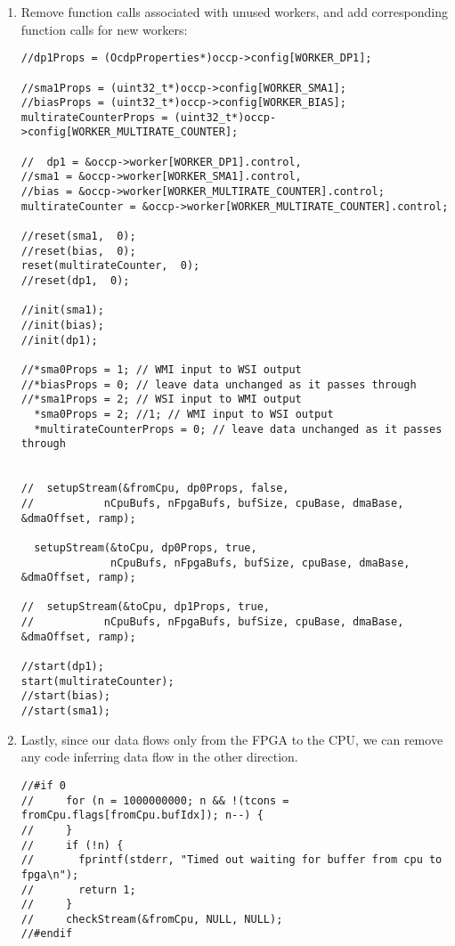 \begin{enumerate}
\begin{lstlisting}[language=customc]
\end{lstlisting}
\item Remove function calls associated with unused workers, and add corresponding function calls for new workers:

\begin{lstlisting}[language=customc]
//dp1Props = (OcdpProperties*)occp->config[WORKER_DP1];

//sma1Props = (uint32_t*)occp->config[WORKER_SMA1];
//biasProps = (uint32_t*)occp->config[WORKER_BIAS];
multirateCounterProps = (uint32_t*)occp->config[WORKER_MULTIRATE_COUNTER];

//  dp1 = &occp->worker[WORKER_DP1].control,
//sma1 = &occp->worker[WORKER_SMA1].control,
//bias = &occp->worker[WORKER_MULTIRATE_COUNTER].control;
multirateCounter = &occp->worker[WORKER_MULTIRATE_COUNTER].control;

//reset(sma1,  0);
//reset(bias,  0);
reset(multirateCounter,  0);
//reset(dp1,  0);

//init(sma1);
//init(bias);
//init(dp1);

//*sma0Props = 1; // WMI input to WSI output
//*biasProps = 0; // leave data unchanged as it passes through
//*sma1Props = 2; // WSI input to WMI output
  *sma0Props = 2; //1; // WMI input to WSI output
  *multirateCounterProps = 0; // leave data unchanged as it passes through


//  setupStream(&fromCpu, dp0Props, false,
//           nCpuBufs, nFpgaBufs, bufSize, cpuBase, dmaBase, &dmaOffset, ramp);

  setupStream(&toCpu, dp0Props, true,
              nCpuBufs, nFpgaBufs, bufSize, cpuBase, dmaBase, &dmaOffset, ramp);

//  setupStream(&toCpu, dp1Props, true,
//           nCpuBufs, nFpgaBufs, bufSize, cpuBase, dmaBase, &dmaOffset, ramp);

//start(dp1);
start(multirateCounter);
//start(bias);
//start(sma1);
\end{lstlisting}

\item Lastly, since our data flows only from the FPGA to the CPU, we can remove any code inferring data flow in the other direction.
\begin{lstlisting}[language=customc]
//#if 0
//     for (n = 1000000000; n && !(tcons = fromCpu.flags[fromCpu.bufIdx]); n--) {
//     }
//     if (!n) {
//       fprintf(stderr, "Timed out waiting for buffer from cpu to fpga\n");
//       return 1;
//     }
//     checkStream(&fromCpu, NULL, NULL);
//#endif
\end{lstlisting}
\end{enumerate}

